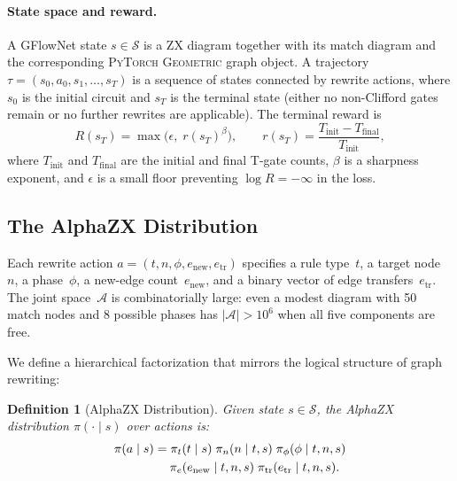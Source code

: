 \documentclass[11pt,a4paper]{article}
\newtheorem{definition}{Definition}
\newcommand{\cA}{\mathcal{A}}
\newcommand{\cS}{\mathcal{S}}
\begin{document}
\paragraph{State space and reward.}
A GFlowNet state $s \in \cS$ is a ZX diagram together with its match
diagram and the corresponding \textsc{PyTorch Geometric} graph object.  A
trajectory $\tau = (s_0, a_0, s_1, \ldots, s_T)$ is a sequence of states
connected by rewrite actions, where $s_0$ is the initial circuit and
$s_T$ is the terminal state (either no non-Clifford gates remain or no
further rewrites are applicable).  The terminal reward is
\begin{equation}\label{eq:reward}
R(s_T) = \max\!\bigl(\epsilon,\;
    r(s_T)^{\beta}\bigr),
\qquad
r(s_T) = \frac{T_{\mathrm{init}} - T_{\mathrm{final}}}{T_{\mathrm{init}}},
\end{equation}
where $T_{\mathrm{init}}$ and $T_{\mathrm{final}}$ are the initial and
final T-gate counts, $\beta$ is a sharpness exponent, and $\epsilon$ is a
small floor preventing $\log R = -\infty$ in the loss.


\subsection{The AlphaZX Distribution}\label{sec:distribution}

Each rewrite action $a = (t, n, \phi, e_{\mathrm{new}},
e_{\mathrm{tr}})$ specifies a rule type~$t$, a target node~$n$, a
phase~$\phi$, a new-edge count~$e_{\mathrm{new}}$, and a binary vector
of edge transfers~$e_{\mathrm{tr}}$.  The joint space~$\cA$ is
combinatorially large: even a modest diagram with 50 match nodes and 8
possible phases has $|\cA| > 10^6$ when all five components are free.

We define a hierarchical factorization that mirrors the logical structure
of graph rewriting:

\begin{definition}[AlphaZX Distribution]\label{def:alphazx_dist}
Given state $s \in \cS$, the AlphaZX distribution $\pi(\cdot \mid s)$
over actions is:
\begin{align}\label{eq:factorization}
\pi(a \mid s) &= \pi_t(t \mid s)\;
               \pi_n(n \mid t, s)\;
               \pi_\phi(\phi \mid t, n, s) \notag \\
            &\quad\; \pi_e(e_{\mathrm{new}} \mid t, n, s)\;
               \pi_{\mathrm{tr}}(e_{\mathrm{tr}} \mid t, n, s).
\end{align}
\end{definition}
\end{document}
